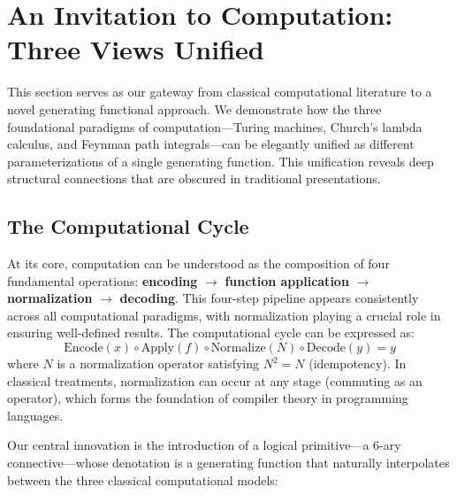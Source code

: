 \section{An Invitation to Computation: Three Views Unified}
\label{sec:computation-paradigms}

This section serves as our gateway from classical computational literature to a novel generating functional approach. We demonstrate how the three foundational paradigms of computation—Turing machines, Church's lambda calculus, and Feynman path integrals—can be elegantly unified as different parameterizations of a single generating function. This unification reveals deep structural connections that are obscured in traditional presentations.

\subsection{The Computational Cycle}

At its core, computation can be understood as the composition of four fundamental operations: \textbf{encoding} $\to$ \textbf{function application} $\to$ \textbf{normalization} $\to$ \textbf{decoding}. This four-step pipeline appears consistently across all computational paradigms, with normalization playing a crucial role in ensuring well-defined results. The computational cycle can be expressed as:
\[
\text{Encode}(x) \circ \text{Apply}(f) \circ \text{Normalize}(N) \circ \text{Decode}(y) = y
\]
where $N$ is a normalization operator satisfying $N^2 = N$ (idempotency). In classical treatments, normalization can occur at any stage (commuting as an operator), which forms the foundation of compiler theory in programming languages.

Our central innovation is the introduction of a logical primitive—a 6-ary connective—whose denotation is a generating function that naturally interpolates between the three classical computational models:


